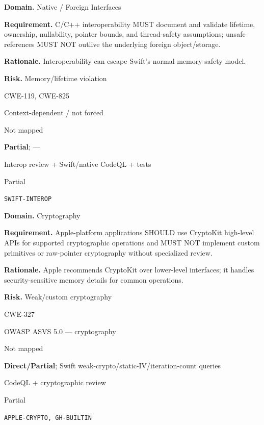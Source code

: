 \documentclass[10pt,letterpaper]{article}
\newcommand{\prioritybadge}[2]{\tcbox[on line,boxrule=0pt,arc=1.2mm,boxsep=0.7mm,left=1mm,right=1mm,top=0.4mm,bottom=0.4mm,colback=#2!12,coltext=#2]{\scriptsize\bfseries #1}}
\begin{document}
\begin{rulebox}[title={\texttt{SCS-SWIFT-FFI-001} \hfill \prioritybadge{Critical Control}{Critical}}]
\textbf{Domain.} Native / Foreign Interfaces

\textbf{Requirement.} C/C++ interoperability MUST document and validate lifetime, ownership, nullability, pointer bounds, and thread-safety assumptions; unsafe references MUST NOT outlive the underlying foreign object/storage.

\textbf{Rationale.} Interoperability can escape Swift's normal memory-safety model.

\textbf{Risk.} Memory/lifetime violation

\begin{description}[leftmargin=2.65cm,labelwidth=2.3cm,style=nextline,itemsep=1pt,topsep=3pt]
  \item[CWE] CWE-119, CWE-825
  \item[OWASP] Context-dependent / not forced
  \item[CERT] Not mapped
  \item[CodeQL] \textbf{Partial}; ---
  \item[Enforcement] Interop review + Swift/native CodeQL + tests
  \item[Automation] Partial
  \item[Sources] \texttt{SWIFT-INTEROP}
\end{description}
\end{rulebox}

\begin{rulebox}[title={\texttt{SCS-SWIFT-CRYPTO-001} \hfill \prioritybadge{Critical Control}{Critical}}]
\textbf{Domain.} Cryptography

\textbf{Requirement.} Apple-platform applications SHOULD use CryptoKit high-level APIs for supported cryptographic operations and MUST NOT implement custom primitives or raw-pointer cryptography without specialized review.

\textbf{Rationale.} Apple recommends CryptoKit over lower-level interfaces; it handles security-sensitive memory details for common operations.

\textbf{Risk.} Weak/custom cryptography

\begin{description}[leftmargin=2.65cm,labelwidth=2.3cm,style=nextline,itemsep=1pt,topsep=3pt]
  \item[CWE] CWE-327
  \item[OWASP] OWASP ASVS 5.0 --- cryptography
  \item[CERT] Not mapped
  \item[CodeQL] \textbf{Direct/Partial}; Swift weak-crypto/static-IV/iteration-count queries
  \item[Enforcement] CodeQL + cryptographic review
  \item[Automation] Partial
  \item[Sources] \texttt{APPLE-CRYPTO, GH-BUILTIN}
\end{description}
\end{rulebox}
\end{document}
